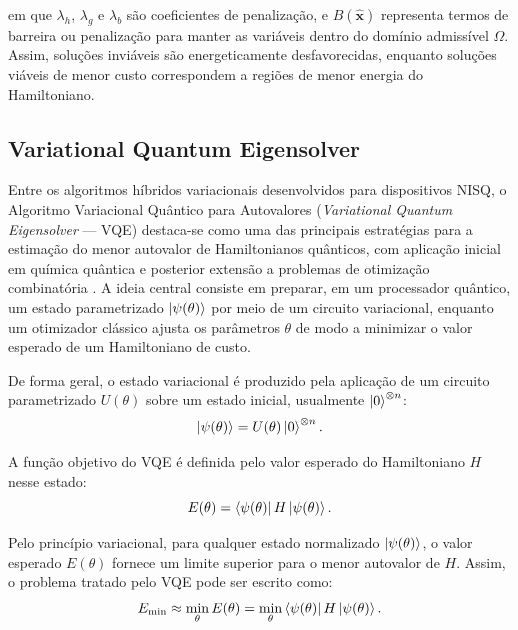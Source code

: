 \noindent em que $\lambda_h$, $\lambda_g$ e $\lambda_b$ são coeficientes de penalização, e $B(\hat{\mathbf{x}})$ representa termos de barreira ou penalização para manter as variáveis dentro do domínio admissível $\Omega$. Assim, soluções inviáveis são energeticamente desfavorecidas, enquanto soluções viáveis de menor custo correspondem a regiões de menor energia do Hamiltoniano. 

\subsection{Variational Quantum Eigensolver}\label{sec:vqe}

Entre os algoritmos híbridos variacionais desenvolvidos para dispositivos NISQ, o Algoritmo Variacional Quântico para Autovalores (\textit{Variational Quantum Eigensolver} --- VQE) \cite{peruzzo2014variational, cerezo2021variational} destaca-se como uma das principais estratégias para a estimação do menor autovalor de Hamiltonianos quânticos, com aplicação inicial em química quântica e posterior extensão a problemas de otimização combinatória \cite{cao2019quantum, moll2018quantum}. A ideia central consiste em preparar, em um processador quântico, um estado parametrizado $\ket{\psi(\theta)}$ por meio de um circuito variacional, enquanto um otimizador clássico ajusta os parâmetros $\theta$ de modo a minimizar o valor esperado de um Hamiltoniano de custo.

De forma geral, o estado variacional é produzido pela aplicação de um circuito parametrizado $U(\theta)$ sobre um estado inicial, usualmente $\ket{0}^{\otimes n}$:
\begin{equation}
    \ket{\psi(\theta)} = U(\theta)\ket{0}^{\otimes n}.
\end{equation}

A função objetivo do VQE é definida pelo valor esperado do Hamiltoniano $H$ nesse estado:
\begin{equation}
    \label{eq:energy_hamiltonian}
    E(\theta) = \bra{\psi(\theta)} H \ket{\psi(\theta)}.
\end{equation}

Pelo princípio variacional, para qualquer estado normalizado $\ket{\psi(\theta)}$, o valor esperado $E(\theta)$ fornece um limite superior para o menor autovalor de $H$. Assim, o problema tratado pelo VQE pode ser escrito como:
\begin{equation}
    E_{\min} \approx \min_{\theta} E(\theta)
    =
    \min_{\theta}
    \bra{\psi(\theta)} H \ket{\psi(\theta)}.
\end{equation}

